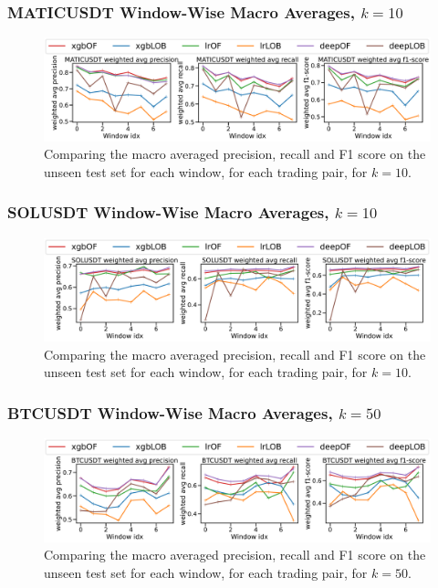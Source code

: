 \documentclass[handout]{beamer}
\begin{document}
\begin{frame}
    \frametitle{MATICUSDT Window-Wise Macro Averages, $k=10$}
    \begin{figure}[htpb!]
        \centering
        \includegraphics[width=1.0\textwidth]{./images/MATICUSDT_macro_results_k=10.pdf}
        \caption{Comparing the macro averaged precision, recall and F1 score on the unseen test set for each window, for each trading pair, for $k=10$.}
        
    \end{figure}
\end{frame}

\begin{frame}
    \frametitle{SOLUSDT Window-Wise Macro Averages, $k=10$}
    \begin{figure}[htpb!]
        \centering
        \includegraphics[width=1.0\textwidth]{./images/SOLUSDT_macro_results_k=10.pdf}
        \caption{Comparing the macro averaged precision, recall and F1 score on the unseen test set for each window, for each trading pair, for $k=10$.}
        
    \end{figure}
\end{frame}

\begin{frame}
    \frametitle{BTCUSDT Window-Wise Macro Averages, $k=50$}
    \begin{figure}[htpb!]
        \centering
        \includegraphics[width=1.0\textwidth]{./images/BTCUSDT_macro_results_k=50.pdf}
        \caption{Comparing the macro averaged precision, recall and F1 score on the unseen test set for each window, for each trading pair, for $k=50$.}
        
    \end{figure}
\end{frame}
\end{document}
